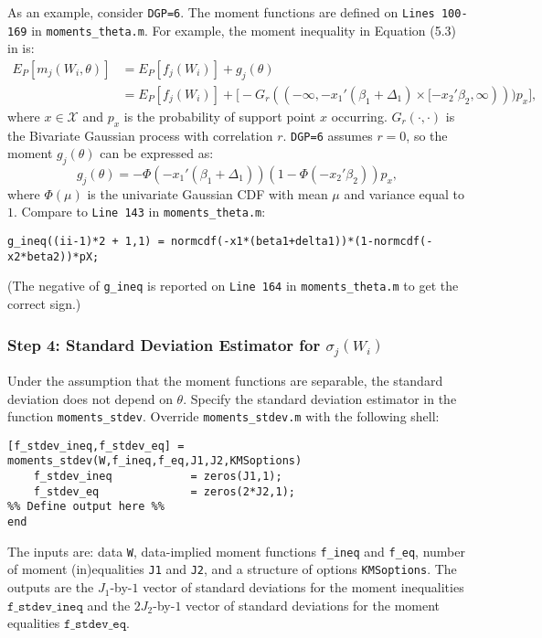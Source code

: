 \documentclass[12pt]{article}
\def\code#1{\texttt{#1}}
\begin{document}
As an example, consider \code{DGP=6}.  The moment functions are defined on \code{Lines 100-169} in  \code{moments\_theta.m}.  For example, the moment inequality in Equation (5.3) in  is:
    \footnotesize
    \begin{align*}
    E_P[m_{j}(W_i,\theta)] & = E_P[f_{j}(W_i)]  + g_{j}(\theta) \\
     & = E_P[f_{j}(W_i)]   +\bigg[ - G_r((-\infty,-x_1'(\beta_1 + \Delta_1) \times [-x_2'\beta_2,\infty)))p_x\bigg],
    \end{align*}\normalsize
where $x \in \mathcal{X}$ and $p_x$ is the probability of support point $x$ occurring. $G_r(\cdot,\cdot)$ is the Bivariate Gaussian process with correlation $r$.  \code{DGP=6} assumes $r=0$, so the moment $g_{j}(\theta)$ can be expressed as:
\[
g_{j}(\theta) =  -\Phi(-x_1'(\beta_1 + \Delta_1))(1- \Phi(-x_2'\beta_2))p_x,
\]
where $\Phi(\mu)$ is the univariate Gaussian CDF with mean $\mu$ and variance equal to $1$.  Compare to \code{Line 143} in \code{moments\_theta.m}:
\footnotesize
    \begin{lstlisting}[backgroundcolor = \color{gray!30},
                   xleftmargin = 0cm,
                   framexleftmargin = 1em]
g_ineq((ii-1)*2 + 1,1) = normcdf(-x1*(beta1+delta1))*(1-normcdf(-x2*beta2))*pX;
    \end{lstlisting}\normalsize
(The negative of \code{g\_ineq} is reported on \code{Line 164} in \code{moments\_theta.m} to get the correct sign.)

\subsubsection*{Step 4: Standard Deviation Estimator for $\sigma_j(W_i)$}
Under the assumption that the moment functions are separable, the standard deviation does not depend on $\theta$.  Specify the standard deviation estimator in the function \code{moments\_stdev}.  Override  \code{moments\_stdev.m} with the following shell:
\footnotesize
\begin{lstlisting}[backgroundcolor = \color{gray!30},
                   xleftmargin = 0cm,
                   framexleftmargin = 1em]
[f_stdev_ineq,f_stdev_eq] = moments_stdev(W,f_ineq,f_eq,J1,J2,KMSoptions)
    f_stdev_ineq            = zeros(J1,1);
    f_stdev_eq              = zeros(2*J2,1);
%% Define output here %%
end
\end{lstlisting} \normalsize
The inputs are: data \code{W}, data-implied moment functions \code{f\_ineq} and \code{f\_eq}, number of moment (in)equalities \code{J1} and \code{J2}, and a structure of options \code{KMSoptions}.  The outputs are the $J_1$-by-$1$ vector of standard deviations for the moment inequalities $\code{f\_stdev\_ineq}$ and the $2J_2$-by-$1$ vector of standard deviations for the moment equalities $\code{f\_stdev\_eq}$.
\end{document}
